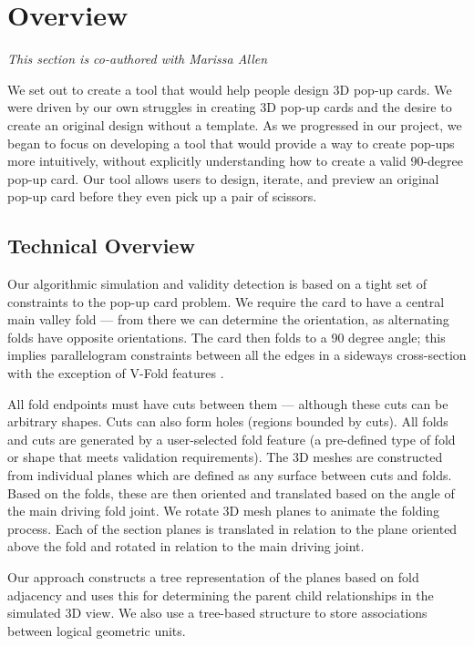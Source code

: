 \section{Overview}\label{overview}

\emph{This section is co-authored with Marissa Allen}

We set out to create a tool that would help people design 3D pop-up
cards. We were driven by our own struggles in creating 3D pop-up cards
and the desire to create an original design without a template. As we
progressed in our project, we began to focus on developing a tool that
would provide a way to create pop-ups more intuitively, without
explicitly understanding how to create a valid 90-degree pop-up card.
Our tool allows users to design, iterate, and preview an original pop-up
card before they even pick up a pair of scissors.

\subsection{Technical Overview}\label{technical-overview}

Our algorithmic simulation and validity detection is based on a tight
set of constraints to the pop-up card problem. We require the card to
have a central main valley fold --- from there we can determine the
orientation, as alternating folds have opposite orientations. The card
then folds to a 90 degree angle; this implies parallelogram constraints
between all the edges in a sideways cross-section with the exception of
V-Fold features .

All fold endpoints must have cuts between them --- although these cuts
can be arbitrary shapes. Cuts can also form holes (regions bounded by
cuts). All folds and cuts are generated by a user-selected fold feature
(a pre-defined type of fold or shape that meets validation
requirements). The 3D meshes are constructed from individual planes
which are defined as any surface between cuts and folds. Based on the
folds, these are then oriented and translated based on the angle of the
main driving fold joint. We rotate 3D mesh planes to animate the folding
process. Each of the section planes is translated in relation to the
plane oriented above the fold and rotated in relation to the main
driving joint.

Our approach constructs a tree representation of the planes based on
fold adjacency and uses this for determining the parent child
relationships in the simulated 3D view. We also use a tree-based
structure to store associations between logical geometric units.

